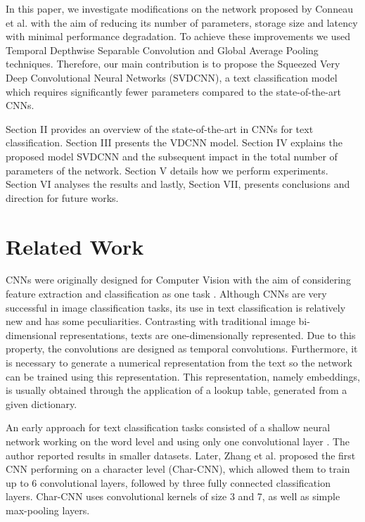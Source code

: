 \documentclass[conference]{IEEEtran}
\begin{document}
In this paper, we investigate modifications on the network proposed by Conneau et al. \cite{conneau2016very} with the aim of reducing its number of parameters, storage size and latency with minimal performance degradation. To achieve these improvements we used Temporal Depthwise Separable Convolution and Global Average Pooling techniques.
Therefore, our main contribution is to propose the Squeezed Very Deep Convolutional Neural
Networks (SVDCNN), a text classification model which requires significantly fewer parameters compared to the state-of-the-art CNNs.

Section II provides an overview of the state-of-the-art in CNNs for text classification. Section III presents the VDCNN model. Section IV explains the proposed model SVDCNN and the subsequent impact in the total number of parameters of the network. Section V details how we perform experiments. Section VI analyses the results and lastly, Section VII, presents conclusions and direction for future works.

 
\section{Related Work}
CNNs were originally designed for Computer Vision with the aim of considering feature extraction and classification as one task \cite{lecun1998gradient}. Although CNNs are very successful in image classification tasks, its use in text classification is relatively new and has some peculiarities. Contrasting with traditional image bi-dimensional representations, texts are one-dimensionally represented. Due to this property, the convolutions are designed as temporal convolutions. Furthermore, it is necessary to generate a numerical representation from the text so the network can be trained using this representation. This representation, namely embeddings, is usually obtained through the application of a lookup table, generated from a given dictionary.

An early approach for text classification tasks consisted of a shallow neural network working on the word level and using only one convolutional layer \cite{kim2014convolutional}. The author reported results in smaller datasets.  Later, Zhang et al. \cite{zhang2015character} proposed the first CNN performing on a character level (Char-CNN), which allowed them to train up to 6 convolutional layers, followed by three fully connected classification layers. Char-CNN uses convolutional kernels of size 3 and 7, as well as simple max-pooling layers. 
\end{document}
